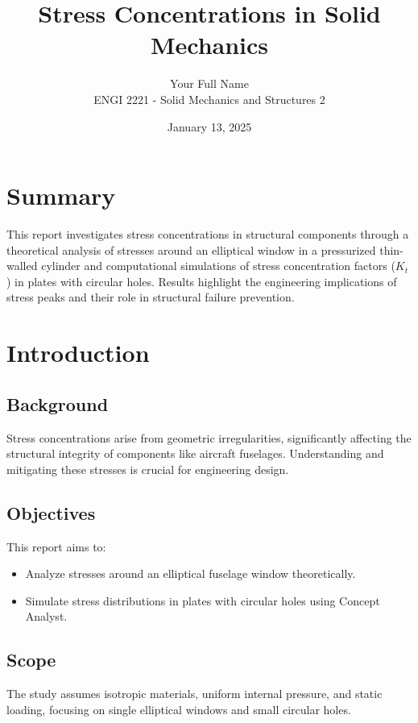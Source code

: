 \documentclass[a4paper,11pt]{article}
\title{Stress Concentrations in Solid Mechanics}
\author{Your Full Name \\ ENGI 2221 - Solid Mechanics and Structures 2}
\date{January 13, 2025}
\begin{document}
\maketitle

\tableofcontents
\newpage

\section*{Summary}
This report investigates stress concentrations in structural components through a theoretical analysis of stresses around an elliptical window in a pressurized thin-walled cylinder and computational simulations of stress concentration factors (\(K_t\)) in plates with circular holes. Results highlight the engineering implications of stress peaks and their role in structural failure prevention.

\section{Introduction}
\subsection{Background}
Stress concentrations arise from geometric irregularities, significantly affecting the structural integrity of components like aircraft fuselages. Understanding and mitigating these stresses is crucial for engineering design.

\subsection{Objectives}
This report aims to:
\begin{itemize}
    \item Analyze stresses around an elliptical fuselage window theoretically.
    \item Simulate stress distributions in plates with circular holes using Concept Analyst.
\end{itemize}

\subsection{Scope}
The study assumes isotropic materials, uniform internal pressure, and static loading, focusing on single elliptical windows and small circular holes.

\newpage

\end{document}
